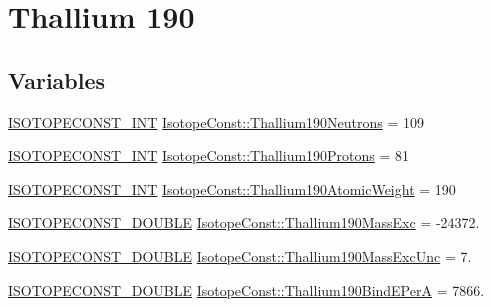 \hypertarget{group___isotope_const-_thallium-_tl190}{}\section{Thallium 190}
\label{group___isotope_const-_thallium-_tl190}
\subsection*{Variables}
\begin{DoxyCompactItemize}
\item 
\mbox{\hyperlink{group___isotope_const-_macros_ga5f18360b3e99483a35c32d789e62621c}{I\+S\+O\+T\+O\+P\+E\+C\+O\+N\+S\+T\+\_\+\+I\+NT}} \mbox{\hyperlink{group___isotope_const-_thallium-_tl190_gad0a5700ef582d1f51baff6bc94146e4f}{Isotope\+Const\+::\+Thallium190\+Neutrons}} = 109
\item 
\mbox{\hyperlink{group___isotope_const-_macros_ga5f18360b3e99483a35c32d789e62621c}{I\+S\+O\+T\+O\+P\+E\+C\+O\+N\+S\+T\+\_\+\+I\+NT}} \mbox{\hyperlink{group___isotope_const-_thallium-_tl190_ga8c568a3b7cc5f44b7bf7be4d999812ca}{Isotope\+Const\+::\+Thallium190\+Protons}} = 81
\item 
\mbox{\hyperlink{group___isotope_const-_macros_ga5f18360b3e99483a35c32d789e62621c}{I\+S\+O\+T\+O\+P\+E\+C\+O\+N\+S\+T\+\_\+\+I\+NT}} \mbox{\hyperlink{group___isotope_const-_thallium-_tl190_ga0bd19914b582bf8d1f93bf8197a7b370}{Isotope\+Const\+::\+Thallium190\+Atomic\+Weight}} = 190
\item 
\mbox{\hyperlink{group___isotope_const-_macros_ga8f45a7272ce02c0b4c65c44636ed719a}{I\+S\+O\+T\+O\+P\+E\+C\+O\+N\+S\+T\+\_\+\+D\+O\+U\+B\+LE}} \mbox{\hyperlink{group___isotope_const-_thallium-_tl190_gae84a00ecd9ef4cd260e0e9ad923f2ff9}{Isotope\+Const\+::\+Thallium190\+Mass\+Exc}} = -\/24372.
\item 
\mbox{\hyperlink{group___isotope_const-_macros_ga8f45a7272ce02c0b4c65c44636ed719a}{I\+S\+O\+T\+O\+P\+E\+C\+O\+N\+S\+T\+\_\+\+D\+O\+U\+B\+LE}} \mbox{\hyperlink{group___isotope_const-_thallium-_tl190_ga2e0bad45316fe8e8c0117b7d8ca64468}{Isotope\+Const\+::\+Thallium190\+Mass\+Exc\+Unc}} = 7.
\item 
\mbox{\hyperlink{group___isotope_const-_macros_ga8f45a7272ce02c0b4c65c44636ed719a}{I\+S\+O\+T\+O\+P\+E\+C\+O\+N\+S\+T\+\_\+\+D\+O\+U\+B\+LE}} \mbox{\hyperlink{group___isotope_const-_thallium-_tl190_ga5bf8985fcaf75caa8a0ee30cd83cc74a}{Isotope\+Const\+::\+Thallium190\+Bind\+E\+PerA}} = 7866.
\item 

\end{DoxyCompactItemize}
